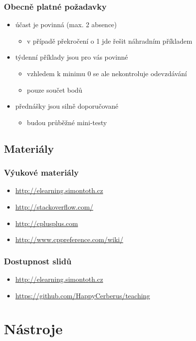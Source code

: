 \begin{frame}
	\frametitle{Obecně platné požadavky}
	\begin{itemize}
		\item{účast je povinná (max. 2 absence)}
		\begin{itemize}
			\item{v případě překročení o 1 jde řešit náhradním příkladem}
		\end{itemize}
		\item{týdenní příklady jsou pro vás povinné}
		\begin{itemize}
			\item{vzhledem k minimu 0 se ale nekontroluje odevzdávání}
			\item{pouze součet bodů}
		\end{itemize}
		\item{přednášky jsou silně doporučované}
		\begin{itemize}
			\item{budou průběžné mini-testy}
		\end{itemize}
	\end{itemize}
\end{frame}

\subsection{Materiály}

\begin{frame}
	\frametitle{Výukové materiály}
	\begin{itemize}
		\item{\url{http://elearning.simontoth.cz}}
		\item{\url{http://stackoverflow.com/}}
		\item{\url{http://cplusplus.com}}
		\item{\url{http://www.cppreference.com/wiki/}}
	\end{itemize}
\end{frame}

\begin{frame}
	\frametitle{Dostupnost slidů}
	\begin{itemize}
		\item{\url{http://elearning.simontoth.cz}}
		\item{\url{https://github.com/HappyCerberus/teaching}}
	\end{itemize}
\end{frame}

\section{Nástroje}
